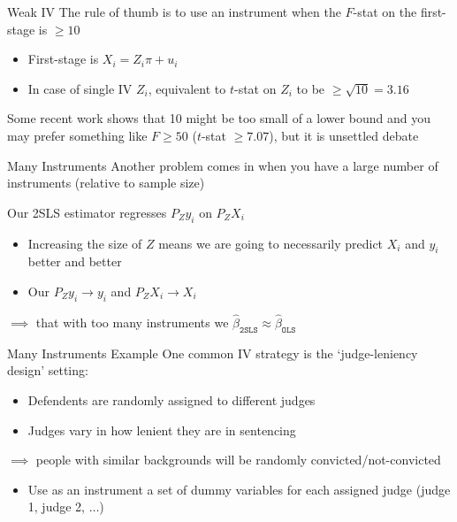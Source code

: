 \documentclass[aspectratio=169,t,11pt,table]{beamer}
\begin{document}
\begin{frame}{Weak IV}
  The rule of thumb is to use an instrument when the $F$-stat on the first-stage is $\geq 10$
  \begin{itemize}
    \item First-stage is $X_i = Z_i \pi + u_i$ 
    
    \item In case of single IV $Z_i$, equivalent to $t$-stat on $Z_i$ to be $\geq \sqrt{10} = 3.16$
  \end{itemize}

  \pause
  \bigskip
  Some recent work shows that 10 might be too small of a lower bound and you may prefer something like $F \geq 50$ ($t$-stat $\geq 7.07$), but it is unsettled debate
\end{frame}

\begin{frame}{Many Instruments}
  Another problem comes in when you have a large number of instruments (relative to sample size)

  \bigskip
  Our 2SLS estimator regresses $P_Z y_i$ on $P_Z X_i$
  \begin{itemize}
    \item Increasing the size of $Z$ means we are going to necessarily predict $X_i$ and $y_i$ better and better
    
    \item Our $P_Z y_i \to y_i$ and $P_Z X_i \to X_i$
  \end{itemize}

  \bigskip
  \pause
  $\implies$ that with too many instruments we $\hat{\beta}_{\texttt{2SLS}} \approx \hat{\beta}_{\texttt{OLS}}$
\end{frame}

\begin{frame}{Many Instruments Example}
  One common IV strategy is the `judge-leniency design' setting:
  \begin{itemize}
    \item Defendents are randomly assigned to different judges
    \item Judges vary in how lenient they are in sentencing
  \end{itemize}

  
  \bigskip
  $\implies$ people with similar backgrounds will be randomly convicted/not-convicted
  \begin{itemize}
    \item Use as an instrument a set of dummy variables for each assigned judge (judge 1, judge 2, $\dots$)
  \end{itemize}
\end{frame}
\end{document}
